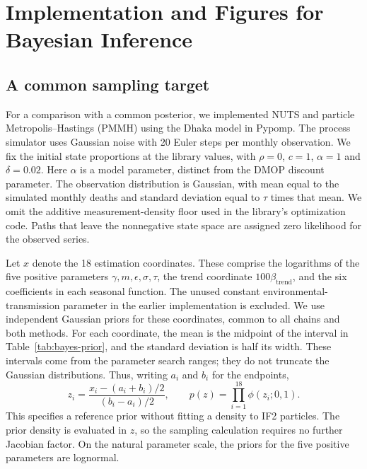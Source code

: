 \documentclass[11pt]{article}
\theoremstyle{thmstylethree}%
\begin{document}
\section{Implementation and Figures for Bayesian Inference}
\label{appendix:bayes}

\subsection{A common sampling target}
\label{sec:bayes-common-target}

For a comparison with a common posterior, we implemented NUTS and particle
Metropolis--Hastings (PMMH) using the Dhaka model in Pypomp.
The process simulator uses Gaussian noise with 20 Euler steps per monthly
observation. We fix the initial state proportions at the library values,
with $\rho=0$, $c=1$, $\alpha=1$ and $\delta=0.02$.
Here $\alpha$ is a model parameter, distinct from the DMOP discount parameter.
The observation distribution is Gaussian, with mean equal to the simulated
monthly deaths and standard deviation equal to $\tau$ times that mean.
We omit the additive measurement-density floor used in the library's
optimization code. Paths that leave the nonnegative state space are assigned
zero likelihood for the observed series.

Let $x$ denote the 18 estimation coordinates. These comprise the logarithms
of the five positive parameters $\gamma,m,\epsilon,\sigma,\tau$, the trend
coordinate $100\beta_{\mathrm{trend}}$, and the six coefficients in each
seasonal function. The unused constant environmental-transmission parameter
in the earlier implementation is excluded.
We use independent Gaussian priors for these coordinates, common to all
chains and both methods. For each coordinate, the mean is the midpoint
of the interval in Table~\ref{tab:bayes-prior}, and the standard deviation
is half its width. These intervals come from the parameter search ranges;
they do not truncate the Gaussian distributions.
Thus, writing $a_i$ and $b_i$ for the endpoints,
\[
 z_i=\frac{x_i-(a_i+b_i)/2}{(b_i-a_i)/2},
 \qquad p(z)=\prod_{i=1}^{18}\phi(z_i;0,1).
\]
This specifies a reference prior without fitting a density to IF2 particles.
The prior density is evaluated in $z$, so the sampling calculation requires
no further Jacobian factor. On the natural parameter scale, the priors for
the five positive parameters are lognormal.
\end{document}
